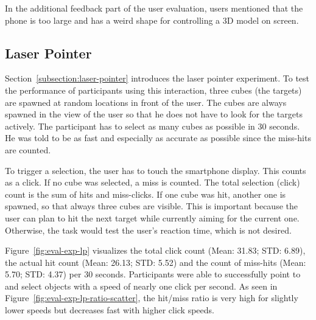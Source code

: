 In the additional feedback part of the user evaluation, users mentioned that the phone is too large and has a weird shape for controlling a \ac{3D} model on screen.


\subsection{Laser Pointer}\label{section:eval-res-lp}

Section~\ref{subsection:laser-pointer} introduces the laser pointer experiment. To test the performance of participants using this interaction, three cubes (the targets) are spawned at random locations in front of the user. The cubes are always spawned in the view of the user so that he does not have to look for the targets actively. The participant has to select as many cubes as possible in 30 seconds. He was told to be as fast and especially as accurate as possible since the miss-hits are counted.

To trigger a selection, the user has to touch the smartphone display. This counts as a click. If no cube was selected, a miss is counted. The total selection (click) count is the sum of hits and miss-clicks. If one cube was hit, another one is spawned, so that always three cubes are visible. This is important because the user can plan to hit the next target while currently aiming for the current one. Otherwise, the task would test the user's reaction time, which is not desired.

Figure~\ref{fig:eval-exp-lp} visualizes the total click count (Mean: 31.83; \ac{STD}: 6.89), the actual hit count (Mean: 26.13; \ac{STD}: 5.52) and the count of miss-hits (Mean: 5.70; \ac{STD}: 4.37) per 30 seconds. Participants were able to successfully point to and select objects with a speed of nearly one click per second. As seen in Figure~\ref{fig:eval-exp-lp-ratio-scatter}, the hit/miss ratio is very high for slightly lower speeds but decreases fast with higher click speeds.

